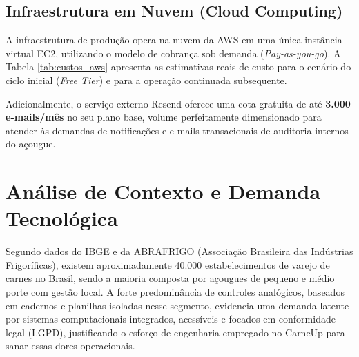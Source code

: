 \documentclass[
	12pt,				%
	openany,			%
	oneside,			%
	a4paper,			%
	english,			%
	french,				%
	spanish,			%
	brazil				%
	]{abntex2}
\begin{document}
\subsection{Infraestrutura em Nuvem (Cloud Computing)}
A infraestrutura de produção opera na nuvem da AWS em uma única instância virtual EC2, utilizando o modelo de cobrança sob demanda (\textit{Pay-as-you-go}). A Tabela \ref{tab:custos_aws} apresenta as estimativas reais de custo para o cenário do ciclo inicial (\textit{Free Tier}) e para a operação continuada subsequente.

\begin{table}[H]
    \centering
    \caption{Estimativa de Custos de Infraestrutura AWS}
    \label{tab:custos_aws}
\end{table}

Adicionalmente, o serviço externo Resend oferece uma cota gratuita de até \textbf{3.000 e-mails/mês} no seu plano base, volume perfeitamente dimensionado para atender às demandas de notificações e e-mails transacionais de auditoria internos do açougue.

\section{Análise de Contexto e Demanda Tecnológica}

Segundo dados do IBGE e da ABRAFRIGO (Associação Brasileira das Indústrias Frigoríficas), existem aproximadamente 40.000 estabelecimentos de varejo de carnes no Brasil, sendo a maioria composta por açougues de pequeno e médio porte com gestão local. A forte predominância de controles analógicos, baseados em cadernos e planilhas isoladas nesse segmento, evidencia uma demanda latente por sistemas computacionais integrados, acessíveis e focados em conformidade legal (LGPD), justificando o esforço de engenharia empregado no CarneUp para sanar essas dores operacionais.
\end{document}
